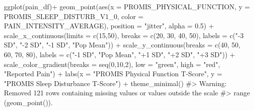 \documentclass[
  letterpaper,
]{latex/krantz}
\makeatletter
\newenvironment{Shaded}{\begin{snugshade}}{\end{snugshade}}
\newcommand{\AttributeTok}[1]{\textcolor[rgb]{0.40,0.45,0.13}{#1}}
\newcommand{\CommentTok}[1]{\textcolor[rgb]{0.37,0.37,0.37}{#1}}
\newcommand{\DecValTok}[1]{\textcolor[rgb]{0.68,0.00,0.00}{#1}}
\newcommand{\FloatTok}[1]{\textcolor[rgb]{0.68,0.00,0.00}{#1}}
\newcommand{\FunctionTok}[1]{\textcolor[rgb]{0.28,0.35,0.67}{#1}}
\newcommand{\NormalTok}[1]{\textcolor[rgb]{0.00,0.23,0.31}{#1}}
\newcommand{\SpecialCharTok}[1]{\textcolor[rgb]{0.37,0.37,0.37}{#1}}
\newcommand{\StringTok}[1]{\textcolor[rgb]{0.13,0.47,0.30}{#1}}
\newenvironment{kframe}{%
\medskip{}
\setlength{\fboxsep}{.8em}
 \def\at@end@of@kframe{}%
 \ifinner\ifhmode%
  \def\at@end@of@kframe{\end{minipage}}%
  \begin{minipage}{\columnwidth}%
 \fi\fi%
 \def\FrameCommand##1{\hskip\@totalleftmargin \hskip-\fboxsep
 \colorbox{shadecolor}{##1}\hskip-\fboxsep
     \hskip-\linewidth \hskip-\@totalleftmargin \hskip\columnwidth}%
 \MakeFramed {\advance\hsize-\width
   \@totalleftmargin\z@ \linewidth\hsize
   \@setminipage}}%
 {\par\unskip\endMakeFramed%
 \at@end@of@kframe}
\renewenvironment{Shaded}{\begin{kframe}}{\end{kframe}}
\makeatother
\begin{document}
\begin{Shaded}
\begin{Highlighting}[]
\FunctionTok{ggplot}\NormalTok{(pain\_df)}\SpecialCharTok{+}
  \FunctionTok{geom\_point}\NormalTok{(}\FunctionTok{aes}\NormalTok{(}\AttributeTok{x =}\NormalTok{ PROMIS\_PHYSICAL\_FUNCTION, }
                 \AttributeTok{y =}\NormalTok{ PROMIS\_SLEEP\_DISTURB\_V1\_0, }
                 \AttributeTok{color =}\NormalTok{ PAIN\_INTENSITY\_AVERAGE), }
             \AttributeTok{position =} \StringTok{"jitter"}\NormalTok{, }\AttributeTok{alpha =} \FloatTok{0.5}\NormalTok{) }\SpecialCharTok{+}
  \FunctionTok{scale\_x\_continuous}\NormalTok{(}\AttributeTok{limits =} \FunctionTok{c}\NormalTok{(}\DecValTok{15}\NormalTok{,}\DecValTok{50}\NormalTok{), }\AttributeTok{breaks =} \FunctionTok{c}\NormalTok{(}\DecValTok{20}\NormalTok{, }\DecValTok{30}\NormalTok{, }\DecValTok{40}\NormalTok{, }\DecValTok{50}\NormalTok{), }
                     \AttributeTok{labels =} \FunctionTok{c}\NormalTok{(}\StringTok{"{-}3 SD"}\NormalTok{, }\StringTok{"{-}2 SD"}\NormalTok{, }\StringTok{"{-}1 SD"}\NormalTok{, }
                                \StringTok{"Pop Mean"}\NormalTok{)) }\SpecialCharTok{+} 
  \FunctionTok{scale\_y\_continuous}\NormalTok{(}\AttributeTok{breaks =} \FunctionTok{c}\NormalTok{(}\DecValTok{40}\NormalTok{, }\DecValTok{50}\NormalTok{, }\DecValTok{60}\NormalTok{, }\DecValTok{70}\NormalTok{, }\DecValTok{80}\NormalTok{), }
                     \AttributeTok{labels =} \FunctionTok{c}\NormalTok{(}\StringTok{"{-}1 SD"}\NormalTok{, }\StringTok{"Pop Mean"}\NormalTok{, }\StringTok{"+1 SD"}\NormalTok{, }\StringTok{"+2 SD"}\NormalTok{, }
                                \StringTok{"+3 SD"}\NormalTok{)) }\SpecialCharTok{+}
  \FunctionTok{scale\_color\_gradient}\NormalTok{(}\AttributeTok{breaks =} \FunctionTok{seq}\NormalTok{(}\DecValTok{0}\NormalTok{,}\DecValTok{10}\NormalTok{,}\DecValTok{2}\NormalTok{), }\AttributeTok{low =} \StringTok{"green"}\NormalTok{, }
                       \AttributeTok{high =} \StringTok{"red"}\NormalTok{, }\StringTok{"Reported Pain"}\NormalTok{) }\SpecialCharTok{+}
  \FunctionTok{labs}\NormalTok{(}\AttributeTok{x =} \StringTok{"PROMIS Physical Function T{-}Score"}\NormalTok{, }
       \AttributeTok{y =} \StringTok{"PROMIS Sleep Disturbance T{-}Score"}\NormalTok{) }\SpecialCharTok{+} 
  \FunctionTok{theme\_minimal}\NormalTok{()}
\CommentTok{\#\textgreater{} Warning: Removed 121 rows containing missing values or values outside the scale}
\CommentTok{\#\textgreater{} range (\textasciigrave{}geom\_point()\textasciigrave{}).}
\end{Highlighting}
\end{Shaded}
\end{document}
